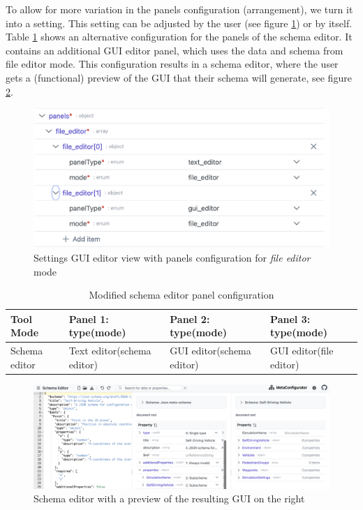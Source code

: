 To allow for more variation in the panels configuration (arrangement), we turn it into a setting.
This setting can be adjusted by the user (see figure \ref{fig:panels_definition_file_editor}) or by \toolname{} itself.
Table \ref{tab:panels_by_mode_schema_editor_with_preview} shows an alternative configuration for the panels of the schema editor.
It contains an additional GUI editor panel, which uses the data and schema from file editor mode. 
This configuration results in a schema editor, where the user gets a (functional) preview of the GUI that their schema will generate, see figure \ref{fig:panels_for_modified_schema_editor_config}.


\begin{figure}[!t]
    \centering
    \includegraphics[width=\columnwidth]{figures/panels_definition_file_editor}
    \caption{Settings GUI editor view with panels configuration for \textit{file editor} mode}
    \label{fig:panels_definition_file_editor}
\end{figure}


\begin{table}[!t]
\caption{Modified schema editor panel configuration}
\label{tab:panels_by_mode_schema_editor_with_preview}
\centering\tiny
\begin{tabular}{@{}llll@{}}
\toprule
\textbf{Tool Mode} & \textbf{Panel 1: type(mode)} & \textbf{Panel 2: type(mode)}& \textbf{Panel 3: type(mode)} \\ \midrule
Schema editor      & Text editor(schema editor)   & GUI editor(schema editor)   & GUI editor(file editor)    
  \\ \bottomrule
\end{tabular}
\end{table}


\begin{figure}
    \includegraphics[width=\textwidth]{figures/panels_for_modified_schema_editor_config}
    \caption{Schema editor with a preview of the resulting GUI on the right}
    \label{fig:panels_for_modified_schema_editor_config}
\end{figure}



